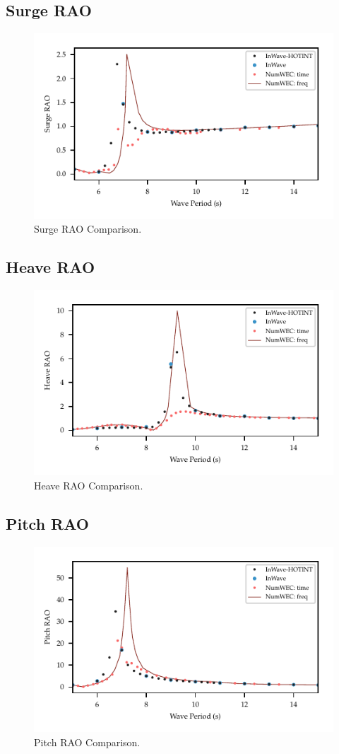 \documentclass[11pt]{article}
\begin{document}
\subsection{Surge RAO}
\label{sec:org1b17e99}
\begin{figure}[htbp]
\centering
\includegraphics[width=.9\linewidth]{images/rao/rao_surge.pdf}
\caption{Surge RAO Comparison.}
\end{figure}

\clearpage
\subsection{Heave RAO}
\label{sec:org388de5b}
\begin{figure}[htbp]
\centering
\includegraphics[width=.9\linewidth]{images/rao/rao_heave.pdf}
\caption{Heave RAO Comparison.}
\end{figure}

\clearpage
\subsection{Pitch RAO}
\label{sec:org04f3989}
\begin{figure}[htbp]
\centering
\includegraphics[width=.9\linewidth]{images/rao/rao_pitch.pdf}
\caption{Pitch RAO Comparison.}
\end{figure}
\end{document}
